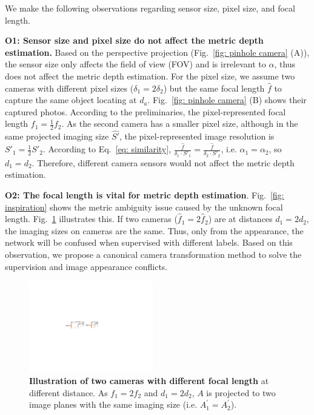 We make the following observations regarding sensor size, pixel size, and focal length.


\noindent\textbf{O1: Sensor size and pixel size do not affect the metric depth estimation.} 
Based on the perspective projection (Fig.~\ref{fig: pinhole camera} (A)), the sensor size only affects the field of view (FOV) and is irrelevant to $\alpha$, thus does not affect the metric depth estimation. 
For the pixel size, %
we assume two cameras with different pixel sizes ($\delta_{1} = 2\delta_{2}$) but the same focal length $\hat{f}$ to capture the same object locating at $d_{a}$. %
Fig.~\ref{fig: pinhole camera} (B) shows their captured photos.
According to the preliminaries, %
the pixel-represented focal length $f_{1} = \frac{1}{2} f_{2}$. 
As the second camera has a smaller pixel size, although in the same projected imaging size $\hat{S'}$, the pixel-represented image resolution is $S'_{1} = \frac{1}{2} S'_{2}$. According to Eq.~\eqref{eq: similarity}, $\frac{\hat{f}}{\delta_{1}\cdot S'_{1}} = \frac{\hat{f}}{\delta_{2}\cdot S'_{2} }$, i.e. $\alpha_1 = \alpha_2$, so $d_{1} = d_{2}$. Therefore, different camera sensors %
would 
not affect the metric depth estimation.


\noindent\textbf{O2: The focal length is vital for %
metric depth estimation}. Fig.~\ref{fig: inspiration} shows the metric ambiguity issue caused by the unknown focal length. 
Fig.~\ref{fig: confusion} %
illustrates 
this. If two cameras ($\hat{f}_{1} = 2\hat{f}_{2}$) are at distances $d_{1} = 2d_{2}$, the imaging sizes on cameras are the same. Thus, only from the appearance, %
the network will be confused when supervised with different labels.
Based on this observation, we propose a canonical camera transformation method to solve the supervision and image appearance conflicts.

\begin{figure}[!bt]
\centering
\includegraphics[width=0.48\textwidth]{./files/confusion}
\caption{\textbf{Illustration of two cameras with different focal length} at different distance. As $f_1=2f_2$ and $d_1=2d_2$, 
$A$ is projected 
to two image planes with the same imaging size (i.e. $A^{'}_1 = A^{'}_2$).
}
\label{fig: confusion}
\vspace{-2em}
\end{figure}




